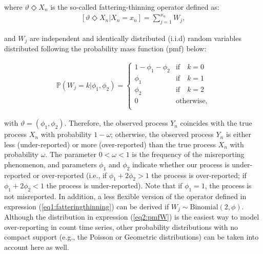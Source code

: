 \documentclass[Afour,sageh,times]{sagej}
\begin{document}
\noindent where $\vartheta \Diamond X_n$ is the so-called fattering-thinning operator defined as:
\begin{align}\label{eq1:fatteringthinning}
\left[\vartheta \Diamond X_n|X_n=x_n\right]=\sum_{j=1}^{x_n}W_j,
\end{align}

\noindent and $W_j$ are independent and identically distributed (i.i.d) random variables distributed following the probability mass function (pmf) below:

\begin{align}\label{eq2:pmfW}
\mathbb{P}(W_j=k|\phi_1,\phi_2)=\begin{cases} 
1-\phi_1-\phi_2  & \textrm{if} \quad k=0 \\
\phi_1 & \textrm{if} \quad k=1 \\
\phi_2 & \textrm{if} \quad k=2  \\
0 & \textrm{otherwise} , \\
\end{cases}
\end{align}

\noindent with $\vartheta=(\phi_1,\phi_2)$. Therefore, the observed process $Y_n$ coincides with the true process $X_n$ with probability $1-\omega$; otherwise, the observed process $Y_n$ is either less (under-reported) or more (over-reported) than the true process $X_n$ with probability $\omega$. The parameter $0<\omega<1$ is the frequency of the misreporting phenomenon, and parameters $\phi_1$ and $\phi_2$ indicate whether our process is under-reported or over-reported (i.e., if $\phi_1+2\phi_2>1$ the process is over-reported; if $\phi_1+2\phi_2<1$ the process is under-reported). Note that if $\phi_1=1$, the process is not misreported. In addition, a less flexible version of the operator defined in expression (\ref{eq1:fatteringthinning}) can be derived if $W_j \sim \textrm{Binomial}(2,\phi)$. Although the distribution in expression (\ref{eq2:pmfW}) is the easiest way to model over-reporting in count time series, other probability distributions with no compact support (e.g., the Poisson or Geometric distributions) can be taken into account here as well. 
\end{document}

